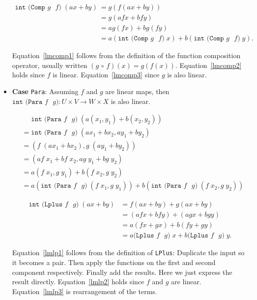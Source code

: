 \begin{itemize}
\begin{align}
  \texttt{int (Comp $g$ $f$)}\; (ax + by)
  &= g ( f (a x + b y)) \label{lmcomp1} \\
  &= g ( a f x + b f y) \label{lmcomp2} \\
  &=  a g (f x) + b g (f y) \label{lmcomp3}  \\
  &= a \left( \texttt{int (Comp $g$ $f$)}\; x \right) + b \left( \texttt{int (Comp $g$ $f$)}\; y \right).
\end{align}

Equation~\eqref{lmcomp1} follows from the definition of the function composition
operator, usually written \((g \, \circ \, f)(x)= g(f(x))\).
Equation~\eqref{lmcomp2} holds since \(f\) is linear.
Equation~\eqref{lmcomp3} since \(g\) is also linear.



\item{\textbf{Case} \texttt{Para}:}
Assuming $f$ and $g$ are linear maps, then
\( \texttt{int (Para $f$ $g$)} \colon U \times V \rightarrow W \times X \) is also linear.


\begin{align}
  &\phantom{=} \texttt{int (Para $f$ $g$)}\; ( a(x_1, y_1) + b(x_2, y_2) ) \\
  &= \texttt{int (Para $f$ $g$)}\; (ax_1+bx_2 , ay_1 + b y_2) \\
  &= (f \; (ax_1+bx_2) , g\; ( a y_1 + b y_2)) \\
  &= (af\;x_1+bf\;x_2 , a g\;  y_1 + b g\; y_2) \\
  &= a(f\;x_1 ,  g\;  y_1) + b(f\;x_2 , g\; y_2) \\
  &= a\left( \texttt{int (Para $f$ $g$)}\; (f\;x_1 , g\; y_1) \right)
   + b\left( \texttt{int (Para $f$ $g$)}\; (f\;x_2 , g\; y_2) \right)
\end{align}



\begin{align}
  \texttt{int (Lplus $f$ $g$)}\; (ax + by)
  &= f (a x + b y) + g (a x + b y) \label{lmlp1} \\
  &= ( a f x + b f y) + ( a g x + b g y)  \label{lmlp2} \\
  &= a (f x + g x) + b (f y + g y) \label{lmlp3}  \\
  &= a \texttt{(Lplus $f$ $g$)}\;x + b  \texttt{(Lplus $f$ $g$)}\;y.
\end{align}

Equation~\eqref{lmlp1} follows from the definition of \texttt{LPlus}:  Duplicate the input
so it becomes a pair.  Then apply the functions on the first and second component
respectively.  Finally add the results.  Here we just express the result directly.
Equation~\eqref{lmlp2} holds since \(f\) and \(g\) are linear.
Equation~\eqref{lmlp3} is rearrangement of the terms.


\end{itemize}

